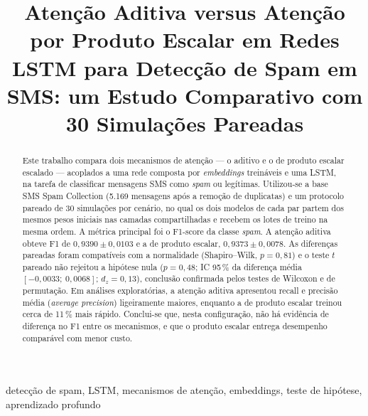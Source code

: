 \documentclass[conference]{IEEEtran}
\begin{document}
\title{Atenção Aditiva versus Atenção por Produto Escalar em Redes LSTM para Detecção de Spam em SMS: um Estudo Comparativo com 30 Simulações Pareadas}

\author{
\and
{}
}

\maketitle

\begin{abstract}
Este trabalho compara dois mecanismos de atenção --- o aditivo e o de produto escalar escalado --- acoplados a uma rede composta por \textit{embeddings} treináveis e uma LSTM, na tarefa de classificar mensagens SMS como \textit{spam} ou legítimas. Utilizou-se a base SMS Spam Collection (5.169 mensagens após a remoção de duplicatas) e um protocolo pareado de 30 simulações por cenário, no qual os dois modelos de cada par partem dos mesmos pesos iniciais nas camadas compartilhadas e recebem os lotes de treino na mesma ordem. A métrica principal foi o F1-score da classe \textit{spam}. A atenção aditiva obteve F1 de $0,9390 \pm 0,0103$ e a de produto escalar, $0,9373 \pm 0,0078$. As diferenças pareadas foram compatíveis com a normalidade (Shapiro--Wilk, $p = 0,81$) e o teste $t$ pareado não rejeitou a hipótese nula ($p = 0,48$; IC 95\,\% da diferença média $[-0,0033;\ 0,0068]$; $d_z = 0,13$), conclusão confirmada pelos testes de Wilcoxon e de permutação. Em análises exploratórias, a atenção aditiva apresentou recall e precisão média (\textit{average precision}) ligeiramente maiores, enquanto a de produto escalar treinou cerca de 11\,\% mais rápido. Conclui-se que, nesta configuração, não há evidência de diferença no F1 entre os mecanismos, e que o produto escalar entrega desempenho comparável com menor custo.
\end{abstract}

\begin{IEEEkeywords}
detecção de spam, LSTM, mecanismos de atenção, embeddings, teste de hipótese, aprendizado profundo
\end{IEEEkeywords}
\end{document}
